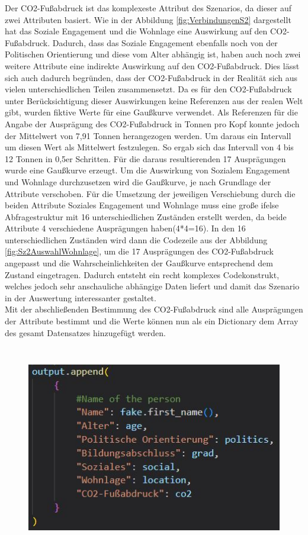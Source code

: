 \begin{onehalfspace}
Der CO2-Fußabdruck ist das komplexeste Attribut des Szenarios, da dieser auf zwei Attributen basiert. Wie in der Abbildung \ref{fig:VerbindungenS2} dargestellt hat das Soziale Engagement und die Wohnlage eine Auswirkung auf den CO2-Fußabdruck. Dadurch, dass das Soziale Engagement ebenfalls noch von der Politischen Orientierung und diese vom Alter abhängig ist, haben auch noch zwei weitere Attribute eine indirekte Auswirkung auf den CO2-Fußabdruck. Dies lässt sich auch dadurch begründen, dass der CO2-Fußabdruck in der Realität sich aus vielen unterschiedlichen Teilen zusammensetzt. Da es für den CO2-Fußabdruck unter Berücksichtigung dieser Auswirkungen keine Referenzen aus der realen Welt gibt, wurden fiktive Werte für eine Gaußkurve verwendet. Als Referenzen für die Angabe der Ausprägung des CO2-Fußabdruck in Tonnen pro Kopf konnte jedoch der Mittelwert von 7,91 Tonnen herangezogen werden.\cite{ClimateWatch2022} Um daraus ein Intervall um diesen Wert als Mittelwert festzulegen. So ergab sich das Intervall von 4 bis 12 Tonnen in 0,5er Schritten. Für die daraus resultierenden 17 Ausprägungen wurde eine Gaußkurve erzeugt. Um die Auswirkung von Sozialem Engagement und Wohnlage durchzusetzen wird die Gaußkurve, je nach Grundlage der Attribute verschoben. Für die Umsetzung der jeweiligen Verschiebung durch die beiden Attribute Soziales Engagement und Wohnlage muss eine große ifelse Abfragestruktur mit 16 unterschiedlichen Zuständen erstellt werden, da beide Attribute 4 verschiedene Ausprägungen haben(4*4=16). In den 16 unterschiedlichen Zuständen wird dann die Codezeile aus der Abbildung \ref{fig:Sz2AuswahlWohnlage}, um die 17 Ausprägungen des CO2-Fußabdruck angepasst und die Wahrscheinlichkeiten der Gaußkurve entsprechend dem Zustand eingetragen. Dadurch entsteht ein recht komplexes Codekonstrukt, welches jedoch sehr anschauliche abhängige Daten liefert und damit das Szenario in der Auswertung interessanter gestaltet.\\
Mit der abschließenden Bestimmung des CO2-Fußabdruck sind alle Ausprägungen der Attribute bestimmt und die Werte können nun als ein Dictionary dem Array des gesamt Datensatzes hinzugefügt werden. 
\begin{figure}[h]
    \centering
    \includegraphics[width=16cm,height=9cm]{Diagramme/Sz2AddEntry.JPG}

\end{figure}
\end{onehalfspace}
